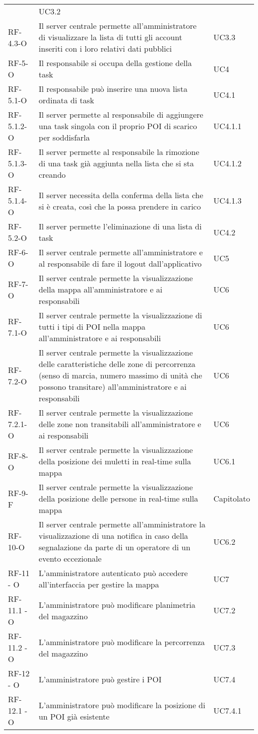 \begin{longtable}{ 
		>{}p{} 
		>{}p{}
		>{\centering}p{} }
&UC3.2
\tabularnewline
RF-4.3-O&
Il server centrale permette all'amministratore di visualizzare la lista di tutti gli account inseriti con i loro relativi dati pubblici
&UC3.3
\tabularnewline
RF-5-O&
Il responsabile si occupa della gestione della task
&UC4
\tabularnewline
RF-5.1-O&
Il responsabile può inserire una nuova lista ordinata di task
&UC4.1
\tabularnewline
RF-5.1.2-O&
Il server permette al responsabile di aggiungere una task singola con il proprio POI di scarico per soddisfarla
&UC4.1.1
\tabularnewline
RF-5.1.3-O&
Il server permette al responsabile la rimozione di una task già aggiunta nella lista che si sta creando
&UC4.1.2
\tabularnewline
RF-5.1.4-O&
Il server necessita della conferma della lista che si è creata, così che la possa prendere in carico
&UC4.1.3
\tabularnewline
RF-5.2-O&
Il server permette l'eliminazione di una lista di task
&UC4.2
\tabularnewline
RF-6-O&
Il server centrale permette all'amministratore e al responsabile di fare il logout dall'applicativo
&UC5
\tabularnewline
RF-7-O&
Il server centrale permette la visualizzazione della mappa all’amministratore e ai responsabili
&UC6
\tabularnewline
RF-7.1-O&
Il server centrale permette la visualizzazione di tutti i tipi di POI nella mappa all'amministratore e ai responsabili
&UC6
\tabularnewline
RF-7.2-O&
Il server centrale permette la visualizzazione delle caratteristiche delle zone di percorrenza (senso di marcia, numero massimo di unità che possono transitare) all’amministratore e ai responsabili
&UC6
\tabularnewline
RF-7.2.1-O&
Il server centrale permette la visualizzazione delle zone non transitabili all’amministratore e ai responsabili
&UC6
\tabularnewline
RF-8-O&
Il server centrale permette la visualizzazione della posizione dei muletti in real-time sulla mappa
&UC6.1
\tabularnewline
RF-9-F&
Il server centrale permette la visualizzazione della posizione delle persone in real-time sulla mappa
&Capitolato
\tabularnewline
RF-10-O&
Il server centrale permette all'amministratore la visualizzazione di una notifica in caso della segnalazione da parte di un operatore di un evento eccezionale
&
UC6.2
\tabularnewline
RF-11
-
O
&
L’amministratore autenticato può accedere all’interfaccia per gestire la mappa
&
UC7
\tabularnewline
RF-11.1
-
O
&
L’amministratore può modificare planimetria del magazzino
&
UC7.2
\tabularnewline
RF-11.2
-
O
&
L’amministratore può modificare la percorrenza del magazzino
&
UC7.3
\tabularnewline
RF-12
-
O
&
L’amministratore può gestire i POI
&
UC7.4
\tabularnewline
RF-12.1
-
O
&
L'amministratore può modificare la posizione di un POI già esistente
&
UC7.4.1
\tabularnewline

\end{longtable}
